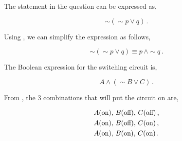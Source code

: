 \begin{subquestions}
\begin{subsubquestions}
The statement in the question can be expressed as,

\begin{equation}
	\sim(\sim p \lor q)\,.
\end{equation}


\subsubquestion

Using , we can simplify the expression as follows,

\begin{equation}
		\sim(\sim p \lor q) \equiv p \, \land \sim q\,.
\end{equation}

\end{subsubquestions}


\subquestion

\begin{subsubquestions}

\subsubquestion

The Boolean expression for the switching circuit is,

\begin{equation}
	A \land (\sim B \lor C)\,.
\end{equation}


\subsubquestion

From , the 3 combinations that will put the circuit on are,

\begin{align}
	& A (\text{on}),\, B (\text{off}),\, C (\text{off})\,, \nonumber \\
	& A (\text{on}),\, B (\text{off}),\, C (\text{on})\,, \nonumber \\
	& A (\text{on}),\, B (\text{on}),\, C (\text{on})\,.
\end{align}


\end{subsubquestions}
\end{subquestions}
